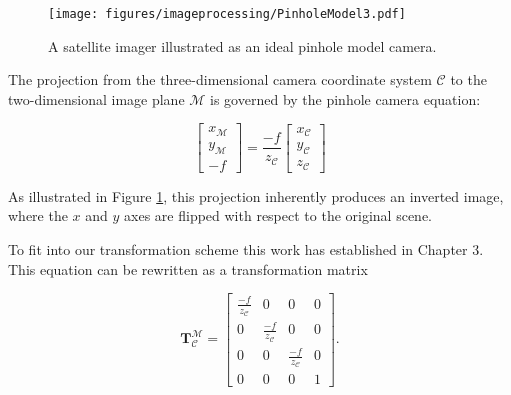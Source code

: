 \begin{figure}[H]
    \centering
    \texttt{[image: figures/imageprocessing/PinholeModel3.pdf]}
    \caption{A satellite imager illustrated as an ideal pinhole model camera.}
    \label{fig:pinhole}
\end{figure}

\noindent
The projection from the three-dimensional camera coordinate system $\mathcal{C}$ to the two-dimensional image plane $\mathcal{M}$ is governed by the pinhole camera equation:

\begin{equation}
\begin{bmatrix}
    x_\mathcal{M} \\
    y_\mathcal{M} \\
    -f
\end{bmatrix}
= \frac{-f}{z_\mathcal{C}}
\begin{bmatrix}
    x_\mathcal{C} \\
    y_\mathcal{C} \\
    z_\mathcal{C}
\end{bmatrix}
\end{equation}

\noindent
As illustrated in Figure \ref{fig:pinhole}, this projection inherently produces an inverted image, where the $x$ and $y$ axes are flipped with respect to the original scene.
\vspace{0.5cm}

\noindent
To fit into our transformation scheme this work has established in Chapter 3. This equation can be rewritten as a transformation matrix

\begin{equation}
    \mathbf{T}_\mathcal{C}^\mathcal{M} = 
    \begin{bmatrix}
        \frac{-f}{z_\mathcal{C}}    & 0                             & 0                          & 0 \\
        0                           & \frac{-f}{z_\mathcal{C}}      & 0                          & 0 \\
        0                           & 0                             & \frac{-f}{z_\mathcal{C}}   & 0 \\
        0                           & 0                             & 0                          & 1        
    \end{bmatrix}
    \text{.}
\end{equation}


